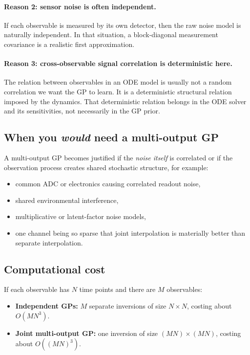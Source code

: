 \documentclass[11pt]{article}
\begin{document}
\paragraph{Reason 2: sensor noise is often independent.}
If each observable is measured by its own detector, then the raw noise model is naturally independent. In that situation, a block-diagonal measurement covariance is a realistic first approximation.

\paragraph{Reason 3: cross-observable signal correlation is deterministic here.}
The relation between observables in an ODE model is usually not a random correlation we want the GP to learn. It is a deterministic structural relation imposed by the dynamics. That deterministic relation belongs in the ODE solver and its sensitivities, not necessarily in the GP prior.

\subsection*{When you \emph{would} need a multi-output GP}
A multi-output GP becomes justified if the \emph{noise itself} is correlated or if the observation process creates shared stochastic structure, for example:
\begin{itemize}
    \item common ADC or electronics causing correlated readout noise,
    \item shared environmental interference,
    \item multiplicative or latent-factor noise models,
    \item one channel being so sparse that joint interpolation is materially better than separate interpolation.
\end{itemize}

\subsection*{Computational cost}
If each observable has $N$ time points and there are $M$ observables:
\begin{itemize}
    \item \textbf{Independent GPs:} $M$ separate inversions of size $N\times N$, costing about $O(MN^3)$.
    \item \textbf{Joint multi-output GP:} one inversion of size $(MN)\times(MN)$, costing about $O((MN)^3)$.
\end{itemize}
\end{document}
